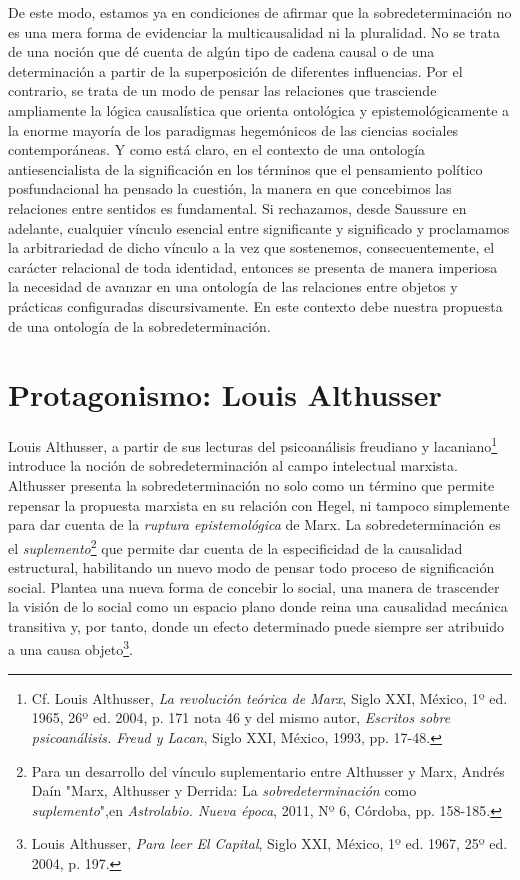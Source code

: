 \documentclass{book}
\begin{document}
De este modo, estamos ya en condiciones de afirmar que la
sobredeterminación no es una mera forma de evidenciar la multicausalidad
ni la pluralidad. No se trata de una noción que dé cuenta de algún tipo
de cadena causal o de una determinación a partir de la superposición de
diferentes influencias. Por el contrario, se trata de un modo de pensar
las relaciones que trasciende ampliamente la lógica causalística que
orienta ontológica y epistemológicamente a la enorme mayoría de los
paradigmas hegemónicos de las ciencias sociales contemporáneas. Y como
está claro, en el contexto de una ontología antiesencialista de la
significación en los términos que el pensamiento político posfundacional
ha pensado la cuestión, la manera en que concebimos las relaciones entre
sentidos es fundamental. Si rechazamos, desde Saussure en adelante,
cualquier vínculo esencial entre significante y significado y
proclamamos la arbitrariedad de dicho vínculo a la vez que sostenemos,
consecuentemente, el carácter relacional de toda identidad, entonces se
presenta de manera imperiosa la necesidad de avanzar en una ontología de
las relaciones entre objetos y prácticas configuradas discursivamente.
En este contexto debe nuestra propuesta de una ontología de la
sobredeterminación.

\hypertarget{protagonismo-louis-althusser}{%
\section{Protagonismo: Louis Althusser}\label{protagonismo-louis-althusser}}

Louis Althusser, a partir de sus lecturas del psicoanálisis freudiano y
lacaniano\footnote{Cf. Louis Althusser, \emph{La revolución teórica de
  Marx}, Siglo XXI, México, 1º ed. 1965, 26º ed. 2004, p. 171 nota 46 y
  del mismo autor, \emph{Escritos sobre psicoanálisis. Freud y Lacan},
  Siglo XXI, México, 1993, pp. 17-48.} introduce la noción de
sobredeterminación al campo intelectual marxista. Althusser presenta la
sobredeterminación no solo como un término que permite repensar la
propuesta marxista en su relación con Hegel, ni tampoco simplemente para
dar cuenta de la \emph{ruptura epistemológica} de Marx. La
sobredeterminación es el \emph{suplemento}\footnote{Para un desarrollo
  del vínculo suplementario entre Althusser y Marx, Andrés Daín "Marx,
  Althusser y Derrida: La \emph{sobredeterminación} como
  \emph{suplemento}",en \emph{Astrolabio. Nueva época}, 2011, Nº 6,
  Córdoba, pp. 158-185.} que permite dar cuenta de la especificidad de
la causalidad estructural, habilitando un nuevo modo de pensar todo
proceso de significación social. Plantea una nueva forma de concebir lo
social, una manera de trascender la visión de lo social como un espacio
plano donde reina una causalidad mecánica transitiva y, por tanto, donde
un efecto determinado puede siempre ser atribuido a una causa
objeto\footnote{Louis Althusser, \emph{Para leer El Capital}, Siglo XXI,
  México, 1º ed. 1967, 25º ed. 2004, p. 197.}.
\end{document}
